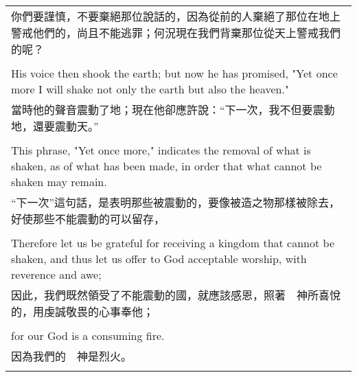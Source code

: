 \documentclass{book}
\begin{document}
\begin{tabularx}{\textwidth}{p{}}
你們要謹慎，不要棄絕那位說話的，因為從前的人棄絕了那位在地上警戒他們的，尚且不能逃罪；何況現在我們背棄那位從天上警戒我們的呢？ \\ \\
His voice then shook the earth; but now he has promised, "Yet once more I will shake not only the earth but also the heaven." \\
當時他的聲音震動了地；現在他卻應許說：“下一次，我不但要震動地，還要震動天。” \\ \\
This phrase, "Yet once more," indicates the removal of what is shaken, as of what has been made, in order that what cannot be shaken may remain. \\
“下一次”這句話，是表明那些被震動的，要像被造之物那樣被除去，好使那些不能震動的可以留存， \\ \\
Therefore let us be grateful for receiving a kingdom that cannot be shaken, and thus let us offer to God acceptable worship, with reverence and awe; \\
因此，我們既然領受了不能震動的國，就應該感恩，照著　神所喜悅的，用虔誠敬畏的心事奉他； \\ \\
for our God is a consuming fire. \\
因為我們的　神是烈火。 \\ \\

\hline
\end{tabularx}

\newpage
\end{document}
